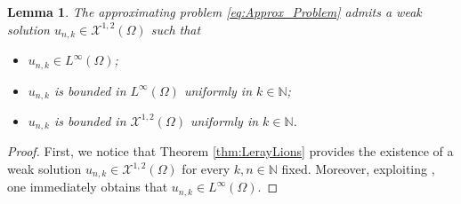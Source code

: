 \documentclass[11pt,a4paper]{amsart}
\theoremstyle{definition}
\theoremstyle{plain}
\newtheorem{lemma}[definition]{Lemma}
\numberwithin{equation}{section}
\begin{document}
{  
\begin{lemma}\label{lem:First_Approx}
The approximating problem \eqref{eq:Approx_Problem} admits a weak solution $u_{n,k}\in \mathcal{X}^{1,2}(\Omega)$ such that
\begin{itemize}
\item[i)] $u_{n,k}\in L^{\infty}(\Omega)$;
\item[ii)] $u_{n,k}$ is bounded in $L^{\infty}(\Omega)$ uniformly in $k\in\mathbb{N}$;
\item[iii)] $u_{n,k}$ is bounded in $\mathcal{X}^{1,2}(\Omega)$ uniformly in $k\in\mathbb{N}$.
\end{itemize}
\end{lemma}  
  \begin{proof}
  First, we notice that Theorem \ref{thm:LerayLions} provides the existence of a
  weak solution $u_{n,k}\in \mathcal{X}^{1,2}(\Omega)$ for every $k,n\in \mathbb{N}$ fixed. Moreover, exploiting \cite{BDVV}, one immediately obtains that $u_{n,k}\in L^{\infty}(\Omega)$. 
  \medskip
  

\end{proof}}
\end{document}
